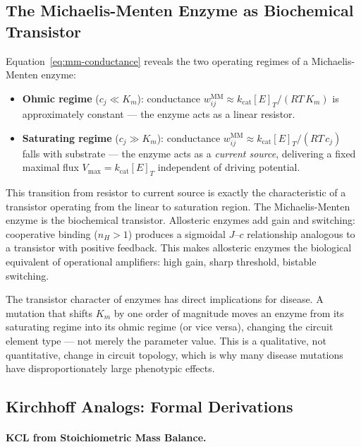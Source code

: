 \subsection{The Michaelis-Menten Enzyme as Biochemical Transistor}

Equation~\eqref{eq:mm-conductance} reveals the two operating regimes of
a Michaelis-Menten enzyme:
\begin{itemize}[noitemsep]
  \item \textbf{Ohmic regime} ($c_j \ll K_m$): conductance
    $w_{ij}^{\mathrm{MM}} \approx k_{\mathrm{cat}}[E]_T/(RT\,K_m)$ is
    approximately constant --- the enzyme acts as a linear resistor.
  \item \textbf{Saturating regime} ($c_j \gg K_m$): conductance
    $w_{ij}^{\mathrm{MM}} \approx k_{\mathrm{cat}}[E]_T/(RT\,c_j)$
    falls with substrate --- the enzyme acts as a \emph{current source},
    delivering a fixed maximal flux $V_{\max} = k_{\mathrm{cat}}[E]_T$
    independent of driving potential.
\end{itemize}
This transition from resistor to current source is exactly the
characteristic of a transistor operating from the linear to saturation
region.  The Michaelis-Menten enzyme is the biochemical transistor.
Allosteric enzymes add gain and switching: cooperative binding ($n_H > 1$)
produces a sigmoidal $J$--$c$ relationship analogous to a transistor
with positive feedback.  This makes allosteric enzymes the biological
equivalent of operational amplifiers: high gain, sharp threshold,
bistable switching.

\begin{remark}
The transistor character of enzymes has direct implications for disease.
A mutation that shifts $K_m$ by one order of magnitude moves an enzyme
from its saturating regime into its ohmic regime (or vice versa), changing
the circuit element type --- not merely the parameter value.  This is a
qualitative, not quantitative, change in circuit topology, which is why
many disease mutations have disproportionately large phenotypic effects.
\end{remark}

\subsection{Kirchhoff Analogs: Formal Derivations}

\paragraph{KCL from Stoichiometric Mass Balance.}

